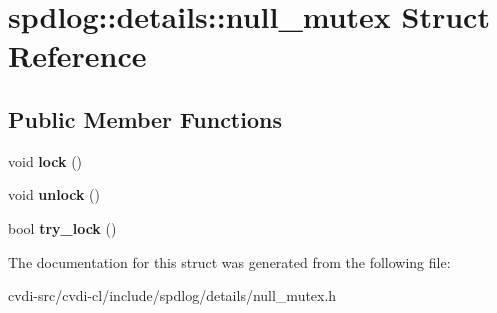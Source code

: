 \hypertarget{structspdlog_1_1details_1_1null__mutex}{}\section{spdlog\+:\+:details\+:\+:null\+\_\+mutex Struct Reference}
\label{structspdlog_1_1details_1_1null__mutex}
\subsection*{Public Member Functions}
\begin{DoxyCompactItemize}
\item 
void {\bfseries lock} ()\hypertarget{structspdlog_1_1details_1_1null__mutex_acaccd5741a4d60756a2c23018f670b9a}{}\label{structspdlog_1_1details_1_1null__mutex_acaccd5741a4d60756a2c23018f670b9a}

\item 
void {\bfseries unlock} ()\hypertarget{structspdlog_1_1details_1_1null__mutex_acbc27862ec43b4b0e9c8f5197174f95f}{}\label{structspdlog_1_1details_1_1null__mutex_acbc27862ec43b4b0e9c8f5197174f95f}

\item 
bool {\bfseries try\+\_\+lock} ()\hypertarget{structspdlog_1_1details_1_1null__mutex_a1e367b1adaa6305edbe163c4d2021c53}{}\label{structspdlog_1_1details_1_1null__mutex_a1e367b1adaa6305edbe163c4d2021c53}

\end{DoxyCompactItemize}


The documentation for this struct was generated from the following file\+:\begin{DoxyCompactItemize}
\item 
cvdi-\/src/cvdi-\/cl/include/spdlog/details/null\+\_\+mutex.\+h\end{DoxyCompactItemize}
